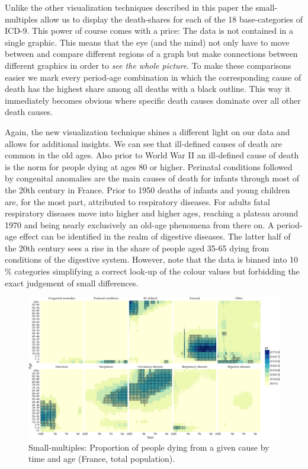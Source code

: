 \documentclass[a4paper]{scrartcl}
\begin{document}
Unlike the other visualization techniques described in this paper the small-multiples allow us to display the death-shares for each of the 18 base-categories of ICD-9. This power of course comes with a price: The data is not contained in a single graphic. This means that the eye (and the mind) not only have to move between and compare different regions of a graph but make connections between different graphics in order to \emph{see the whole picture}. To make these comparisons easier we mark every period-age combination in which the corresponding cause of death has the highest share among all deaths with a black outline. This way it immediately becomes obvious where specific death causes dominate over all other death causes.

Again, the new visualization technique shines a different light on our data and allows for additional insights. We can see that ill-defined causes of death are common in the old ages. Also prior to World War II an ill-defined cause of death is the norm for people dying at ages 80 or higher. Perinatal conditions followed by congenital anomalies are the main causes of death for infants through most of the 20th century in France. Prior to 1950 deaths of infants and young children are, for the most part, attributed to respiratory diseases. For adults fatal respiratory diseases move into higher and higher ages, reaching a plateau around 1970 and being nearly exclusively an old-age phenomena from there on. A period-age effect can be identified in the realm of digestive diseases. The latter half of the 20th century sees a rise in the share of people aged 35-65 dying from conditions of the digestive system. However, note that the data is binned into 10\,\% categories simplifying a correct look-up of the colour values but forbidding the exact judgement of small differences.

\begin{landscape}

\begin{figure}[htb!]
  \centering
  \includegraphics[width = \linewidth]{../fig/plot-small_multiples.pdf}
  \caption{Small-multiples: Proportion of people dying from a given cause by time and age (France, total population).}
  \label{fig:smg}
\end{figure}

\end{landscape}
\end{document}
